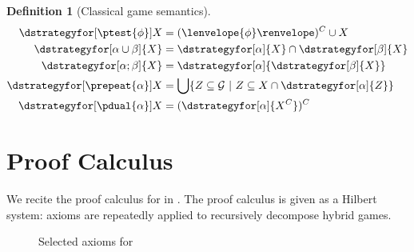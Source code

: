 \documentclass[12pt]{cmuthesis}
\theoremstyle{definition}
\newtheorem{definition}{Definition}
\theoremstyle{remark}
\newcommand{\rref}[2][]{\prettyref{#2}}
\newcommand{\allstate}{\mathcal{G}}
\newcommand{\fint}[1]{\lenvelope{#1}\renvelope}
\begin{document}
\begin{definition}[Classical game semantics]
\begin{align*}
\dstrategyfor[\ptest{\phi}]{X}         &= (\fint{\phi})^C \cup X\\
\dstrategyfor[\alpha\cup\beta]{X}   &= \dstrategyfor[\alpha]{X} \cap \dstrategyfor[\beta]{X}\\
\dstrategyfor[\alpha;\beta]{X}      &=  \dstrategyfor[\alpha]{\dstrategyfor[\beta]{X}}\\
\dstrategyfor[\prepeat{\alpha}]{X}  &= \bigcup\{Z \subseteq \allstate~|~ Z \subseteq X \cap \dstrategyfor[\alpha]{Z}\}\\
\dstrategyfor[\pdual{\alpha}]{X}    &= (\dstrategyfor[\alpha]{X^C})^C
\end{align*}
\end{definition}


\section{Proof Calculus}
We recite the proof calculus for \dGL in \rref{fig:dgl-axioms}.
The proof calculus is given as a Hilbert system: axioms are repeatedly applied to recursively decompose hybrid games.
\begin{figure}
  \centering
  \begin{calculuscollections}{\columnwidth}
    \begin{calculus}
\cinferenceRule[dglbox|{$[\cdot]$}]{}
{
\linferenceRule[equiv]{\dbox{\alpha}{\phi}}{\neg\ddiamond{\alpha}{\neg\phi}}
}{}
\cinferenceRule[dglassign|{$\langle:=\rangle$}]{}
{
}{}
{
}{}
{
}{}
{
\linferenceRule[equiv]{\ddiamond{\ptest{\psi}}{\phi}}{(\phi \land \psi)}
}{}
{
\linferenceRule[equiv]{\ddiamond{\alpha \cup \beta}{\phi}}{\ddiamond{\alpha}{\phi} \lor \ddiamond{\beta}{\phi}}
}{}
{
\linferenceRule[equiv]{\ddiamond{\alpha;\beta}{\phi}}{\ddiamond{\alpha}{\ddiamond{\beta}{\phi}}}
}{}
{
\linferenceRule[impl]{\phi\lor\ddiamond{\alpha}{\ddiamond{\prepeat{\alpha}}{\phi}}}{\ddiamond{\prepeat{\alpha}}{\phi}}
}{}
{
\linferenceRule[equiv]{\ddiamond{\pdual{\alpha}}{\phi}}{\neg\ddiamond{\alpha}{\neg\phi}}
}{}
\cinferenceRule[dglMon|M]{}
{
\linferenceRule[formula]{\phi\limply\psi}{\ddiamond{\alpha}{\phi}\limply\ddiamond{\alpha}{\psi}}
}{}
\cinferenceRule[dglfixpoint|FP]{}
{
\linferenceRule[formula]{\phi\lor\ddiamond{\alpha}{\psi} \limply \psi}{\ddiamond{\prepeat{\alpha}}{\phi} \to \psi}
}{}
    \end{calculus}
  \end{calculuscollections}
  \caption{Selected axioms for \dGL}
  \label{fig:dgl-axioms}
\end{figure}
\end{document}
